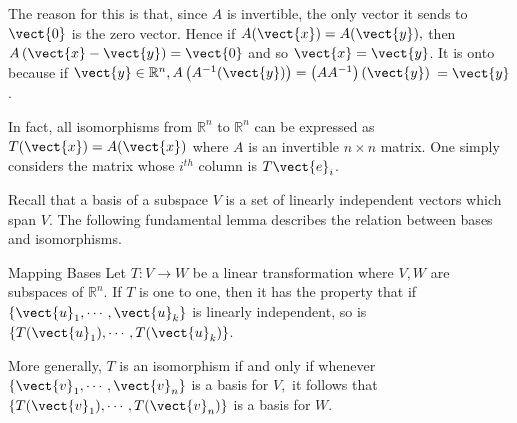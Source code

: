 \begin{solution}
The reason for this is that, since $A$ is invertible, the only vector it
sends to $\vect{0}$ is the zero vector. Hence if $A(\vect{x})=A(\vect{y}),$ then $A\left( \vect{x}-\vect{y}\right) =\vect{0}$ and so $\vect{x}=\vect{y}$. It is onto
because if $\vect{y}\in \mathbb{R}^{n},A\left( A^{-1} (\vect{y})\right) =\left(
AA^{-1}\right) (\vect{y})$ $=\vect{y}$. 
\end{solution}

In fact, all isomorphisms from $\mathbb{R}^{n}$ to $\mathbb{R}^{n}$ can be expressed as $T(\vect{x}) = A(\vect{x})$ where $A$ is an invertible $n \times n$ matrix. One
simply considers the matrix whose $i^{th}$ column is $T\vect{e}_{i}$.

Recall that a basis of a subspace $V$ is a set of linearly independent vectors which span $V$. The following fundamental lemma describes the relation between bases and
isomorphisms.

\begin{lemma}{Mapping Bases}\label{lem:mappingbases}
Let $T:V\rightarrow W$ be a linear transformation where $V,W$ are
subspaces of $\mathbb{R}^n$. If $T$ is one to one, then it has the property that if $\left\{ \vect{u}_{1},\cdots ,\vect{u}_{k}\right\} $ is linearly independent, so is $\left\{ T(\vect{u}_{1}),\cdots ,T(\vect{u}_{k})\right\} $.

More generally, $T$ is an isomorphism if and only if whenever $\left\{ 
\vect{v}_{1},\cdots ,\vect{v}_{n}\right\} $ is a basis for $V,$ it follows that $\left\{ T
(\vect{v}_{1}),\cdots ,T(\vect{v}_{n})\right\} $ is a basis for $W$. 
\end{lemma}

